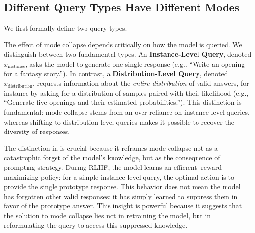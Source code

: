 \subsection{Different Query Types Have Different Modes }\label{sec:oracle_principle} 

We first formally define two query types. %

\begin{definition}\label{def:query_types}
The effect of mode collapse depends critically on how the model is queried. We distinguish between two fundamental types. An \textbf{Instance-Level Query}, denoted $x_{\text{instance}}$, asks the model to generate one single response %
(e.g., ``Write an opening for a fantasy story.''). In contrast, a \textbf{Distribution-Level Query}, denoted $x_{\text{distribution}}$, requests information about the \textit{entire distribution} of valid answers, for instance by asking %
for a distribution of samples paired with their likelihood (e.g., ``Generate five openings and their estimated probabilities.''). This distinction is fundamental: mode collapse stems from an over-reliance on instance-level queries, whereas shifting to distribution-level queries makes it possible to recover the diversity of responses.


\end{definition}

The distinction in  is crucial because it reframes mode collapse not as a catastrophic forget of the model's knowledge, but as the consequence of prompting strategy. During RLHF, the model learns an efficient, reward-maximizing policy: for a simple instance-level query, the optimal action is to provide the single prototype response. This behavior does not mean the model has forgotten other valid responses; it has simply learned to {suppress} them in favor of the prototype answer. This insight is powerful because it suggests that the solution to mode collapse lies not in retraining the model, but in reformulating the query to access this suppressed knowledge.


